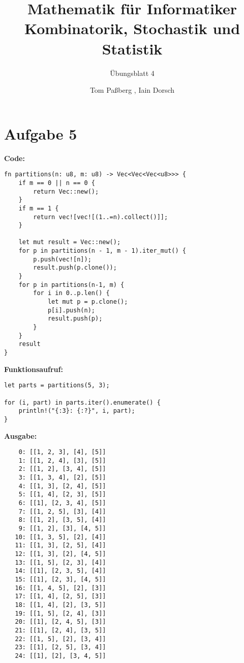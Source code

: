 \documentclass[a4paper]{scrartcl}
\title{Mathematik für Informatiker \\ Kombinatorik, Stochastik und Statistik}
\subtitle{Übungsblatt 4}
\author{Tom Paßberg , Iain Dorsch}
\date{}
\begin{document}
\maketitle

\newpage

\section*{Aufgabe 5}

\textbf{Code:}
\begin{lstlisting}
fn partitions(n: u8, m: u8) -> Vec<Vec<Vec<u8>>> {
    if m == 0 || n == 0 {
        return Vec::new();
    }
    if m == 1 {
        return vec![vec![(1..=n).collect()]];
    }

    let mut result = Vec::new();
    for p in partitions(n - 1, m - 1).iter_mut() {
        p.push(vec![n]);
        result.push(p.clone());
    }
    for p in partitions(n-1, m) {
        for i in 0..p.len() {
            let mut p = p.clone();
            p[i].push(n);
            result.push(p);
        }
    }
    result
}
\end{lstlisting}

\textbf{Funktionsaufruf:}
\begin{lstlisting}
let parts = partitions(5, 3);

for (i, part) in parts.iter().enumerate() {
    println!("{:3}: {:?}", i, part);    
}
\end{lstlisting}

\textbf{Ausgabe:}
\begin{lstlisting}
    0: [[1, 2, 3], [4], [5]]
    1: [[1, 2, 4], [3], [5]]
    2: [[1, 2], [3, 4], [5]]
    3: [[1, 3, 4], [2], [5]]
    4: [[1, 3], [2, 4], [5]]
    5: [[1, 4], [2, 3], [5]]
    6: [[1], [2, 3, 4], [5]]
    7: [[1, 2, 5], [3], [4]]
    8: [[1, 2], [3, 5], [4]]
    9: [[1, 2], [3], [4, 5]]
   10: [[1, 3, 5], [2], [4]]
   11: [[1, 3], [2, 5], [4]]
   12: [[1, 3], [2], [4, 5]]
   13: [[1, 5], [2, 3], [4]]
   14: [[1], [2, 3, 5], [4]]
   15: [[1], [2, 3], [4, 5]]
   16: [[1, 4, 5], [2], [3]]
   17: [[1, 4], [2, 5], [3]]
   18: [[1, 4], [2], [3, 5]]
   19: [[1, 5], [2, 4], [3]]
   20: [[1], [2, 4, 5], [3]]
   21: [[1], [2, 4], [3, 5]]
   22: [[1, 5], [2], [3, 4]]
   23: [[1], [2, 5], [3, 4]]
   24: [[1], [2], [3, 4, 5]]
\end{lstlisting}
\end{document}
